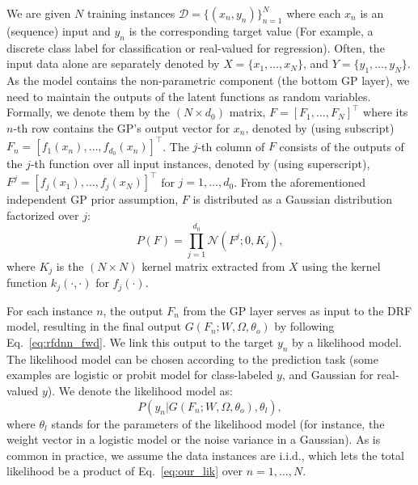 \documentclass[conference]{IEEEtran}
\begin{document}
We are given $N$ training instances $\mathcal{D}=\{(x_n, y_n)\}_{n=1}^N$ 
where each $x_n$ is an (sequence) input and $y_n$ is the corresponding target 
value (For example, a discrete class label for classification or real-valued for regression). Often, the input data alone are separately denoted by $X = \{x_1,\dots,x_N\}$, and $Y =\{y_1,\dots,y_N\}$. As the model contains the non-parametric component (the bottom GP layer), we need to maintain the outputs of the latent functions as random variables. Formally, we denote them by the $(N \times d_0)$ matrix, 
$F = [F_1, \dots, F_N]^\top$ where its $n$-th row contains the GP's output 
vector for $x_n$, denoted by (using subscript)  $F_n = [f_1(x_n), \dots, f_{d_0}(x_n)]^\top$. The $j$-th column of $F$  consists of the outputs of the $j$-th function over all input instances,  denoted by (using superscript), $F^j = [f_j(x_1), \dots, f_j(x_N)]^\top$  for $j=1,\dots,d_0$. From the aforementioned independent GP prior assumption, $F$ is distributed as a Gaussian distribution factorized over $j$:
\begin{equation}
P(F) = \prod_{j=1}^{d_0} \mathcal{N}(F^j; 0, K_j),
\label{eq:our_P(F)}
\end{equation}
where $K_j$ is the $(N \times N)$ kernel matrix extracted from $X$ using the kernel 
function $k_j(\cdot,\cdot)$ for $f_j(\cdot)$. 

For each instance $n$, the output $F_n$ from the GP layer serves as input to 
the DRF model, resulting in the final output $G(F_n; W, \Omega, \theta_o)$ 
by following Eq.~\ref{eq:rfdnn_fwd}. We link this output to the target $y_n$ 
by a likelihood model. The likelihood model can be chosen according to the prediction task (some examples are logistic or probit model for class-labeled $y$, and Gaussian for real-valued $y$). We denote the likelihood model as: 
\begin{equation}
P(y_n|G(F_n; W, \Omega, \theta_o), \theta_l),
\label{eq:our_lik}
\end{equation}
where $\theta_l$ stands for the parameters of the likelihood model (for instance, 
the weight vector in a logistic model or the noise variance in a Gaussian). 
As is common in practice, we assume the data instances are i.i.d., which lets 
the total likelihood be a product of Eq.~\ref{eq:our_lik} over $n=1,\dots,N$.
\end{document}
